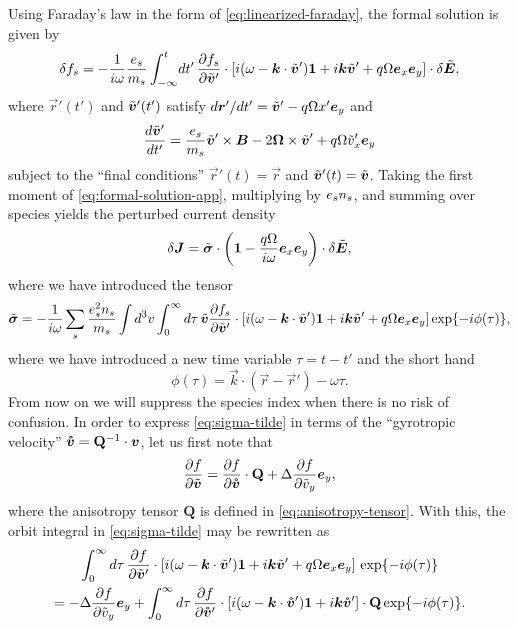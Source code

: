 \documentclass[aps,pre,notitlepage,amsmath,amssymb,amsfonts,nobibnotes,nofootinbib]{revtex4-1}
\begin{document}
Using Faraday's law in the form of \cref{eq:linearized-faraday}, the formal
solution is given by
\begin{equation}
  \label{eq:formal-solution-app}
  \delta f_s = -\frac{1}{i\omega}\frac{\qs}{m_s}\int_{-\infty}^t\!dt'\,
  \pder{f_s}{\tvec{v}'}
  \cdot[i(\omega - \vec{k}\cdot\tvec{v}')\mathbf{1} + i\vec{k}\tvec{v}'
  + q\Omega\ex\ey]
  \cdot\delta\tvec{E},
\end{equation}
where $\vec{r}'(t')$ and $\tilde{\bm{v}}'(t')$ satisfy
$d\bm{r}'/dt'=\tilde{\bm{v}}'-q\Omega{}x'\bm{e}_y$ and
\begin{equation}
  \label{eq:unperturbed-eom}
  \der{\tvec{v}'}{t'} = \frac{\qs}{m_s}\tvec{v}'\times\vec{B}
  - 2\vec{\Omega}\times\tvec{v}' + q\Omega\tilde{v}_x'\ey
\end{equation}
subject to the ``final conditions'' $\vec{r}'(t)=\vec{r}$ and
$\tilde{\bm{v}}'(t)=\tilde{\bm{v}}$. Taking the first moment of
\cref{eq:formal-solution-app}, multiplying by $e_s n_s$, and summing over
species yields the perturbed current density
\begin{equation}
  \label{eq:conductive-relation-tilde}
  \delta\vec{J} = \tvec{\sigma}
  \cdot\left(\mathbf{1} - \frac{q\Omega}{i\omega}\ex\ey\right)
  \cdot\delta\tvec{E},
\end{equation}
where we have introduced the tensor
\begin{equation}
  \label{eq:sigma-tilde}
  \tvec{\sigma}
  = -\frac{1}{i\omega}\sums\frac{\qs^2n_s}{m_s}\int d^3v\int_0^\infty d\tau\,
  \tvec{v}\pder{f_s}{\tvec{v}'}
  \cdot[i(\omega - \vec{k}\cdot\tvec{v}')\mathbf{1} + i\vec{k}\tvec{v}'
  + q\Omega\ex\ey]\exp\{-i\phi(\tau)\},
\end{equation}
where we have introduced a new time variable $\tau=t-t'$ and the short hand
\begin{equation}
  \phi(\tau) = \vec{k}\cdot(\vec{r} - \vec{r}') - \omega\tau.
\end{equation}
From now on we will suppress the species index when there is no risk of
confusion. In order to express \cref{eq:sigma-tilde} in terms of the
``gyrotropic velocity'' $\bm{\mathring{v}}=\mathbf{Q}^{-1}\cdot\bm{v}$, let us first note
that
\begin{equation}
  \label{eq:df-dvtwiddle}
  \pder{f}{\tvec{v}}
  = \pder{f}{\vvc}\cdot\mathbf{Q} + \Delta\pder{f}{\tilde{v}_y}\ey,
\end{equation}
where the anisotropy tensor $\mathbf{Q}$ is defined in
\cref{eq:anisotropy-tensor}. With this, the orbit integral in
\cref{eq:sigma-tilde} may be rewritten as
\begin{multline}
  \label{eq:by-parts}
  \int_0^\infty d\tau\,\pder{f}{\tvec{v}'}
  \cdot[i(\omega - \vec{k}\cdot\tvec{v}')\mathbf{1} + i\vec{k}\tvec{v}'
  + q\Omega\ex\ey]
  \,\exp\{-i\phi(\tau)\} \\
  = -\Delta\pder{f}{\tilde{v}_y}\ey
  + \int_0^\infty d\tau\,\pder{f}{\vvc'}
  \cdot[i(\omega - \vec{k}\cdot\vvc')\mathbf{1} + i\vec{k}\vvc']
  \cdot\mathbf{Q}\exp\{-i\phi(\tau)\}.
\end{multline}
\end{document}
